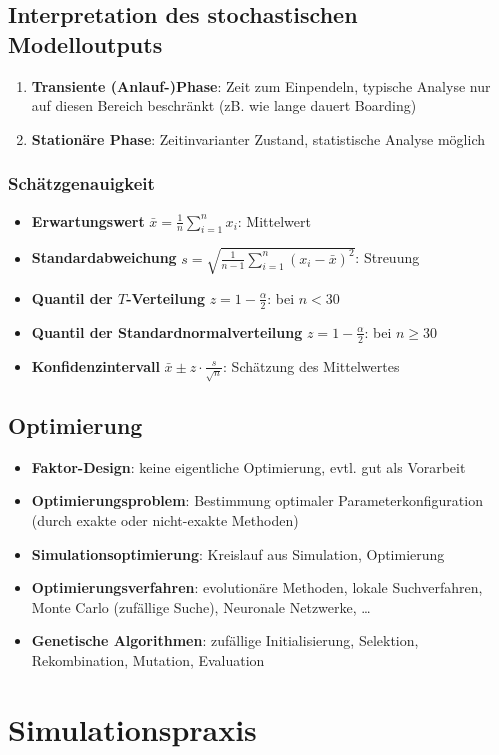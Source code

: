 \documentclass{article}
\begin{document}
\subsection{Interpretation des stochastischen Modelloutputs}
\begin{enumerate}
  \item \textbf{Transiente (Anlauf-)Phase}: Zeit zum Einpendeln, typische Analyse nur auf diesen Bereich beschränkt (zB. wie lange dauert Boarding)
  \item \textbf{Stationäre Phase}: Zeitinvarianter Zustand, statistische Analyse möglich
\end{enumerate}

\subsubsection{Schätzgenauigkeit}
\begin{itemize}
  \item \textbf{Erwartungswert} $\bar{x} = \frac{1}{n} \sum_{i=1}^n x_i$: Mittelwert
  \item \textbf{Standardabweichung} $s = \sqrt{\frac{1}{n-1} \sum_{i=1}^n (x_i - \bar{x})^2}$: Streuung
  \item \textbf{Quantil der $T$-Verteilung} $z=1-\frac{\alpha}{2}$: bei $n < 30$
  \item \textbf{Quantil der Standardnormalverteilung} $z=1-\frac{\alpha}{2}$: bei $n \geq 30$
  \item \textbf{Konfidenzintervall} $\bar{x} \pm z \cdot \frac{s}{\sqrt{n}}$: Schätzung des Mittelwertes
\end{itemize}

\subsection{Optimierung}
\begin{itemize}
  \item \textbf{Faktor-Design}: keine eigentliche Optimierung, evtl. gut als Vorarbeit
  \item \textbf{Optimierungsproblem}: Bestimmung optimaler Parameterkonfiguration (durch exakte oder nicht-exakte Methoden)
  \item \textbf{Simulationsoptimierung}: Kreislauf aus Simulation, Optimierung
  \item \textbf{Optimierungsverfahren}: evolutionäre Methoden, lokale Suchverfahren, Monte Carlo (zufällige Suche), Neuronale Netzwerke, …
  \item \textbf{Genetische Algorithmen}: zufällige Initialisierung, Selektion, Rekombination, Mutation, Evaluation
\end{itemize}

\section{Simulationspraxis}
\end{document}
